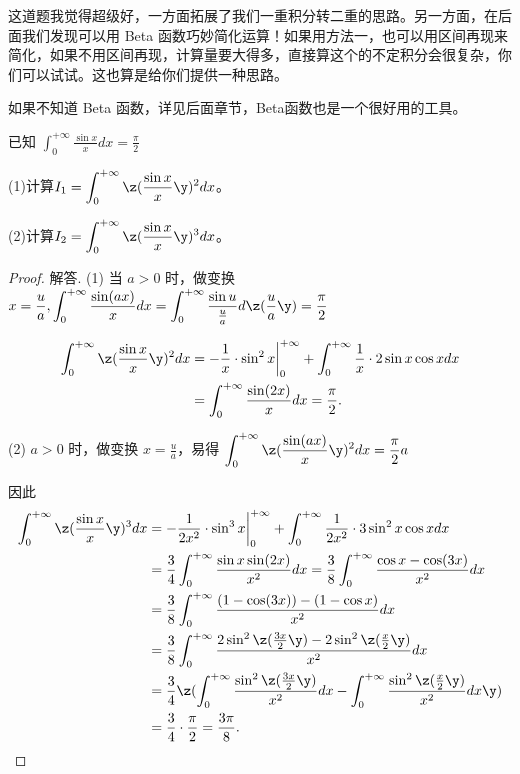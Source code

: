 \begin{remark}
这道题我觉得超级好，一方面拓展了我们一重积分转二重的思路。另一方面，在后面我们发现可以用 Beta 函数巧妙简化运算！如果用方法一，也可以用区间再现来简化，如果不用区间再现，计算量要大得多，直接算这个的不定积分会很复杂，你们可以试试。这也算是给你们提供一种思路。

如果不知道 Beta 函数，详见后面章节，Beta函数也是一个很好用的工具。
\end{remark}
\vspace{3mm}


\begin{example}[十六届CMC初]
已知 \(\displaystyle \int_{0}^{+\infty} \frac{\sin x}{x} dx = \frac{\pi}{2} \)

(1)计算\(\displaystyle I_1=\int_{0}^{+\infty} \z( \frac{\sin x}{x} \y)^2 dx \)。

(2)计算\(\displaystyle I_2=\int_{0}^{+\infty} \z( \frac{\sin x}{x} \y)^3 dx \)。
\end{example}

\begin{proof}
解答. (1) 当 \( a > 0 \) 时，做变换 \(\displaystyle x = \frac{u}{a} ,\int_{0}^{+\infty} \frac{\sin(ax)}{x} dx = \int_{0}^{+\infty} \frac{\sin u}{\frac{u}{a}} d\z( \dfrac{u}{a} \y) = \frac{\pi}{2} \)

\[\begin{aligned}
\int_{0}^{+\infty} \z( \frac{\sin x}{x} \y)^2 dx &= -\frac{1}{x} \cdot \sin^2 x \bigg|_{0}^{+\infty} + \int_{0}^{+\infty} \frac{1}{x} \cdot 2 \sin x \cos x dx \\
&= \int_{0}^{+\infty} \frac{\sin(2x)}{x} dx = \frac{\pi}{2}.
\end{aligned}\]


(2) \( a > 0 \) 时，做变换 \(\displaystyle x = \frac{u}{a} \)，易得 \( \displaystyle \int_{0}^{+\infty} \z( \frac{\sin(ax)}{x} \y)^2 dx = \frac{\pi}{2} a \)

因此
\begin{align*}
\int_{0}^{+\infty} \z( \frac{\sin x}{x} \y)^3 dx &= -\frac{1}{2x^2} \cdot \sin^3 x \bigg|_{0}^{+\infty} + \int_{0}^{+\infty} \frac{1}{2x^2} \cdot 3 \sin^2 x \cos x dx \\
&= \frac{3}{4} \int_{0}^{+\infty} \frac{\sin x \sin(2x)}{x^2} dx = \frac{3}{8} \int_{0}^{+\infty} \frac{\cos x - \cos(3x)}{x^2} dx \\
&= \frac{3}{8} \int_{0}^{+\infty} \frac{(1 - \cos(3x)) - (1 - \cos x)}{x^2} dx \\
&= \frac{3}{8} \int_{0}^{+\infty} \frac{2 \sin^2 \z( \frac{3x}{2} \y) - 2 \sin^2 \z( \frac{x}{2} \y)}{x^2} dx \\
&= \frac{3}{4} \z( \int_{0}^{+\infty} \frac{\sin^2 \z( \frac{3x}{2} \y)}{x^2} dx - \int_{0}^{+\infty} \frac{\sin^2 \z( \frac{x}{2} \y)}{x^2} dx \y) \\
&= \frac{3}{4} \cdot \frac{\pi}{2} = \frac{3\pi}{8}.
\end{align*}
\end{proof}

